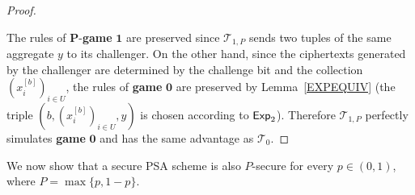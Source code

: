 \documentclass[10pt]{extarticle}
\begin{document}
\begin{proof}
\begin{description}
\end{description}
The rules of $\boldsymbol P$-\textbf{game} $\boldsymbol 1$ are preserved since $\mathcal{T}_{1,P}$ sends two tuples of the same aggregate $y$ to its challenger. On the other hand, since the ciphertexts generated by the challenger are determined by the challenge bit and the collection $(x_i^{[b]})_{i\in U}$, the rules of \textbf{game} $\boldsymbol 0$ are preserved by Lemma~\ref{EXPEQUIV} (the triple $(b,(x_i^{[b]})_{i\in U},y)$ is chosen according to $\mbox{\upshape \sffamily Exp}_2$). Therefore $\mathcal{T}_{1,P}$ perfectly simulates \textbf{game} $\boldsymbol 0$ and has the same advantage as $\mathcal{T}_0$.
\end{proof}

We now show that a secure PSA scheme is also $P$-secure for every $p\in(0,1)$, where $P=\max\{p,1-p\}$.
\end{document}
